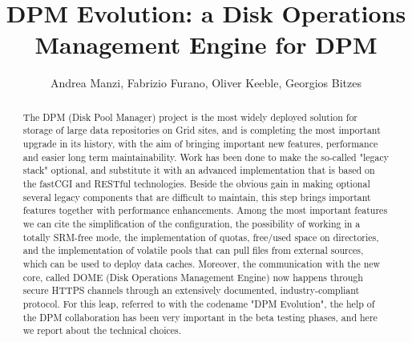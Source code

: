 \documentclass[a4paper]{jpconf}
\begin{document}
\title{
DPM Evolution: a Disk Operations Management Engine for DPM}

\author{Andrea Manzi, Fabrizio Furano, Oliver Keeble, Georgios Bitzes}

\address{CERN IT}


\begin{abstract}

The DPM (Disk Pool Manager) project is the most widely deployed solution for storage of
large data repositories on Grid sites, and is completing the most important upgrade
in its history, with the aim of bringing important new features, performance
and easier long term maintainability.
Work has been done to make the so-called "legacy stack" optional, and substitute
it with an advanced implementation that is based on the fastCGI and RESTful technologies.
Beside the obvious gain in making optional several legacy components that
are difficult to maintain, this step brings important features together with
performance enhancements. Among the most important features we can cite the
simplification of the configuration, the possibility of working in a totally
SRM-free mode, the implementation of quotas, free/used space on directories,
and the implementation of volatile pools that can pull files from external
sources, which can be used to deploy data caches.
Moreover, the communication with the new core, called DOME
(Disk Operations Management Engine) now happens through secure HTTPS channels
through an extensively documented, industry-compliant protocol.
For this leap, referred to with the codename "DPM Evolution", the help of the
DPM collaboration has been very important in the beta testing phases,
and here we report about the technical choices.

\end{abstract}



\newpage %


\end{document}
